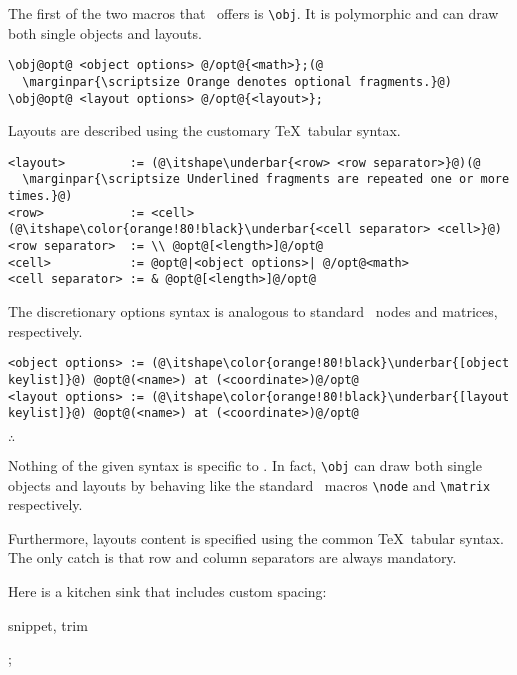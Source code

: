 The first of the two macros that \koDi\ offers is \lstinline|\obj|.
It is polymorphic and can draw both single objects and layouts.

\begin{lstlisting}
\obj@opt@ <object options> @/opt@{<math>};(@
  \marginpar{\scriptsize Orange denotes optional fragments.}@)
\obj@opt@ <layout options> @/opt@{<layout>};
\end{lstlisting}

Layouts are described using the customary \TeX\ tabular syntax.

\begin{lstlisting}
<layout>         := (@\itshape\underbar{<row> <row separator>}@)(@
  \marginpar{\scriptsize Underlined fragments are repeated one or more times.}@)
<row>            := <cell> (@\itshape\color{orange!80!black}\underbar{<cell separator> <cell>}@)
<row separator>  := \\ @opt@[<length>]@/opt@
<cell>           := @opt@|<object options>| @/opt@<math>
<cell separator> := & @opt@[<length>]@/opt@
\end{lstlisting}

The discretionary options syntax is analogous to standard \TikZ\ nodes and
matrices, respectively.

\begin{lstlisting}
<object options> := (@\itshape\color{orange!80!black}\underbar{[object keylist]}@) @opt@(<name>) at (<coordinate>)@/opt@
<layout options> := (@\itshape\color{orange!80!black}\underbar{[layout keylist]}@) @opt@(<name>) at (<coordinate>)@/opt@
\end{lstlisting}

\hfill$\therefore$\hfill\null

Nothing of the given syntax is specific to \koDi.
In fact, \lstinline|\obj| can draw both single objects and layouts
by behaving like the standard \TikZ\ macros
\lstinline|\node| and \lstinline|\matrix| respectively.

Furthermore, layouts content is specified using the common \TeX\
tabular syntax.
The only catch is that row and column separators are always mandatory.

Here is a kitchen sink that includes custom spacing:

\begin{tcblisting}{snippet, trim}
\begin{kodi}[square=3em]
;
\end{kodi}
\end{tcblisting}

